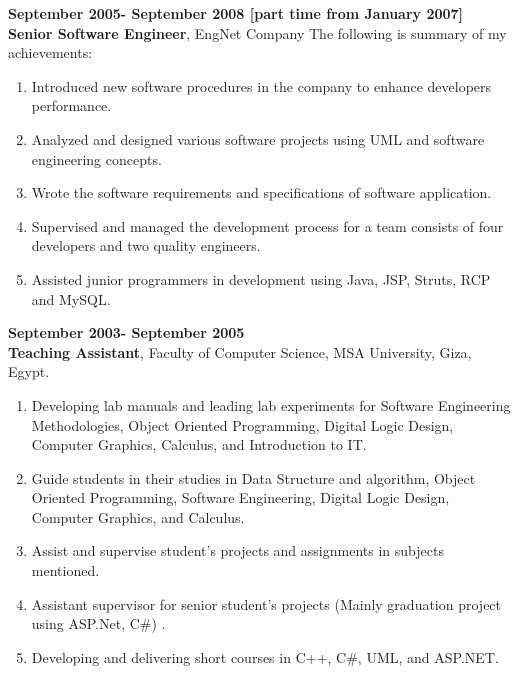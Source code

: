 \documentclass{article}
\begin{document}
 \textbf{September 2005- September 2008 [part time from January 2007] }\\
 \textbf{Senior Software Engineer}, EngNet Company\textbf{}
 The following is summary of my achievements:
 \begin{enumerate}

\item Introduced new software procedures in the company to enhance developers performance.
 \item Analyzed and designed various software projects using UML and software engineering concepts.
 \item Wrote the software requirements and specifications of software
 application.
 \item Supervised and managed the development process for a team consists of four developers and two quality engineers.
 \item Assisted junior programmers in development using Java, JSP, Struts, RCP and MySQL.
\end{enumerate}

 \textbf{September 2003- September 2005}\\
 \textbf{Teaching Assistant}, Faculty of Computer Science, MSA University, Giza, Egypt.\textbf{}
 \begin{enumerate}
\item Developing lab manuals and leading lab experiments for Software Engineering Methodologies, Object Oriented Programming, Digital Logic Design, Computer Graphics, Calculus, and Introduction to IT.
 \item Guide students in their studies in Data Structure and algorithm, Object Oriented Programming, Software Engineering, Digital Logic Design, Computer Graphics, and Calculus.
 \item Assist and supervise student's projects and assignments in subjects mentioned.
 \item Assistant supervisor for senior student's projects (Mainly graduation project using ASP.Net, C\#) .
 \item Developing and delivering short courses in C++, C\#, UML, and ASP.NET.
\end{enumerate}
\end{document}
